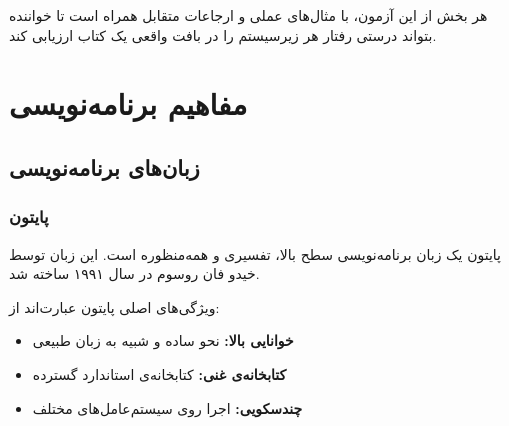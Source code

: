 \documentclass{matinbook}
\begin{document}
هر بخش از این آزمون، با مثال‌های عملی و ارجاعات متقابل
همراه است تا خواننده بتواند درستی رفتار هر زیرسیستم را
در بافت واقعی یک کتاب ارزیابی کند.

\clearpage

\tableofcontents
\clearpage

\listoffigures
\clearpage

\listoftables
\clearpage

\mainmatter
\mainmattergeometry

\chapter{مفاهیم برنامه‌نویسی}
\label{chap:programming}

\section{زبان‌های برنامه‌نویسی}
\label{sec:programming-languages}

\subsection{پایتون}
\label{sec:programming-python}

پایتون یک زبان برنامه‌نویسی سطح بالا،
تفسیری و همه‌منظوره است. این زبان توسط خیدو فان
روسوم در سال ۱۹۹۱ ساخته شد.


ویژگی‌های اصلی پایتون عبارت‌اند از:

\begin{itemize}
    \item \textbf{خوانایی بالا:} نحو ساده و شبیه به
    زبان طبیعی
    \item \textbf{کتابخانه‌ی غنی:} کتابخانه‌ی استاندارد
    گسترده
    \item \textbf{چندسکویی:} اجرا روی سیستم‌عامل‌های
    مختلف
\end{itemize}
\end{document}
